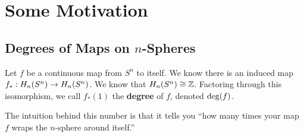 \section{Some Motivation}

\subsection{Degrees of Maps on $n$-Spheres}

\begin{boxdefinition}[Degree]
    Let $f$ be a continuous map from $S^n$ to itself. We know there is an induced map $f_{*} : H_n\!\left( S^n \right) \to H_n\!\left( S^n \right)$. We know that $H_n\!\left( S^n \right) \cong \mathbb{Z}$. Factoring through this isomorphism, we call $f_{*}(1)$ the \textbf{degree} of $f$, denoted $\deg\!\left( f \right)$.
\end{boxdefinition}

The intuition behind this number is that it tells you ``how many times your map $f$ wraps the $n$-sphere around itself.''

